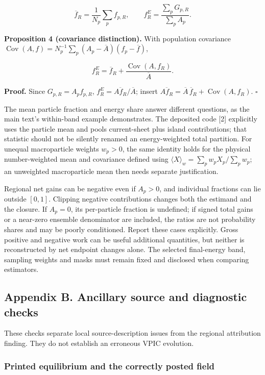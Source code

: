 \[
\overline f_R=\frac1{N_p}\sum_p f_{p,R},\qquad
f_R^E=\frac{\sum_pG_{p,R}}{\sum_pA_p}.
\]

\textbf{Proposition 4 (covariance distinction).} With population
covariance \(\operatorname{Cov}(A,f)=N_p^{-1}\sum_p(A_p-\overline A)
(f_p-\overline f)\),

\[
f_R^E=\overline f_R+
\frac{\operatorname{Cov}(A,f_R)}{\overline A}.
\]

\textbf{Proof.} Since \(G_{p,R}=A_pf_{p,R}\),
\(f_R^E=\overline{Af_R}/\overline A\); insert
\(\overline{Af_R}=\overline A\,\overline f_R+
\operatorname{Cov}(A,f_R)\). \(\square\)

The mean particle fraction and energy share answer different questions,
as the main text's within-band example demonstrates. The deposited code
{[}2{]} explicitly uses the particle mean and pools current-sheet plus
island contributions; that statistic should not be silently renamed an
energy-weighted total partition. For unequal macroparticle weights
\(w_p>0\), the same identity holds for the physical number-weighted mean
and covariance defined using
\(\langle X\rangle_w=\sum_pw_pX_p/\sum_pw_p\); an unweighted
macroparticle mean then needs separate justification.

Regional net gains can be negative even if \(A_p>0\), and individual
fractions can lie outside \([0,1]\). Clipping negative contributions
changes both the estimand and the closure. If \(A_p=0\), its
per-particle fraction is undefined; if signed total gains or a near-zero
ensemble denominator are included, the ratios are not probability shares
and may be poorly conditioned. Report these cases explicitly. Gross
positive and negative work can be useful additional quantities, but
neither is reconstructed by net endpoint changes alone. The selected
final-energy band, sampling weights and masks must remain fixed and
disclosed when comparing estimators.

\subsection{Appendix B. Ancillary source and diagnostic
checks}\label{appendix-b.-ancillary-source-and-diagnostic-checks}

These checks separate local source-description issues from the regional
attribution finding. They do not establish an erroneous VPIC evolution.

\subsubsection{Printed equilibrium and the correctly posted
field}\label{printed-equilibrium-and-the-correctly-posted-field}

